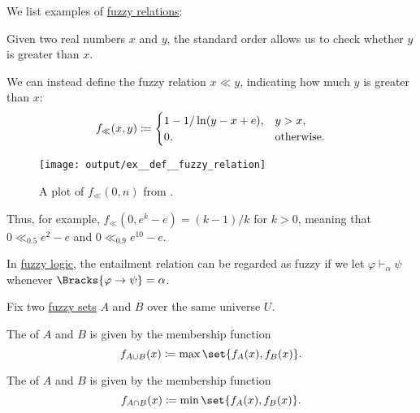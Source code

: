 \begin{example}\label{ex:def:fuzzy_relation}
  We list examples of \hyperref[def:fuzzy_relation]{fuzzy relations}:
  \begin{thmenum}
     Given two real numbers \( x \) and \( y \), the standard order allows us to check whether \( y \) is greater than \( x \).

    We can instead define the fuzzy relation \( x \ll y \), indicating how much \( y \) is greater than \( x \):
    \begin{equation*}
      f_\ll(x, y) \coloneqq \begin{cases}
        1 - 1 / \ln(y - x + e), &y > x, \\
        0,                      &\T{otherwise.}
      \end{cases}
    \end{equation*}

    \begin{figure}[!ht]
      \centering
      \texttt{[image: output/ex\_\_def\_\_fuzzy\_relation]}
      \caption{A plot of \( f_\ll(0, n) \) from .}\label{fig:ex:def:fuzzy_relation/leq}
    \end{figure}

    Thus, for example, \( f_\ll(0, e^k - e) = (k - 1) / k \) for \( k > 0 \), meaning that \( 0 \ll_{0.5} e^2 - e \) and \( 0 \ll_{0.9} e^{10} - e \).

     In \hyperref[def:propositional_semantics/fuzzy]{fuzzy logic}, the entailment relation can be regarded as fuzzy if we let \( \varphi \vdash_\alpha \psi \) whenever \( \Bracks{\varphi \rightarrow \psi} = \alpha \).
  \end{thmenum}
\end{example}

\begin{definition}\label{def:basic_fuzzy_set_operations}
  Fix two \hyperref[def:fuzzy_set]{fuzzy sets} \( A \) and \( B \) over the same universe \( U \).

  \begin{thmenum}
     The  of \( A \) and \( B \) is given by the membership function
    \begin{equation}\label{eq:def:basic_fuzzy_set_operations/union}
      f_{A \cup B} (x) \coloneqq \max\set{ f_A(x), f_B(x) }.
    \end{equation}

     The  of \( A \) and \( B \) is given by the membership function
    \begin{equation}\label{eq:def:basic_fuzzy_set_operations/intersection}
      f_{A \cap B} (x) \coloneqq \min\set{ f_A(x), f_B(x) }.
    \end{equation}
  \end{thmenum}
\end{definition}

